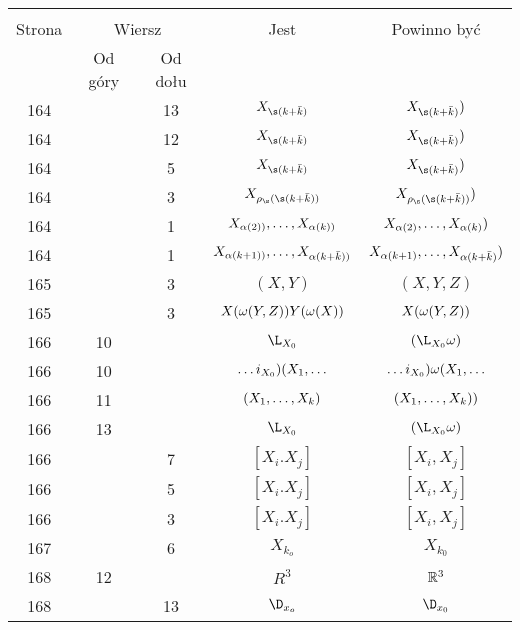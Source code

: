 \documentclass[a4paper,11pt]{article}
\begin{document}
\begin{center}
  \begin{tabular}{|c|c|c|c|c|}
    \hline
    & \multicolumn{2}{c|}{} & & \\
    Strona & \multicolumn{2}{c|}{Wiersz} & Jest
                              & Powinno być \\ \cline{2-3}
    & Od góry & Od dołu & & \\
    \hline
    164 & & 13 & $X_{ \s( k + \bar{ k } ) }$
           & $X_{ \s( k + \bar{ k } ) } )$ \\
    164 & & 12 & $X_{ \s( k + \bar{ k } ) }$
           & $X_{ \s( k + \bar{ k } ) } )$ \\
    164 & &  5 & $X_{ \s( k + \bar{ k } ) }$
           & $X_{ \s( k + \bar{ k } ) } )$ \\
    164 & &  3 & $X_{ \rho_{ \s }( \s( k + \bar{ k } ) ) }$
           & $X_{ \rho_{ \s }( \s( k + \bar{ k } ) ) } )$ \\
    164 & &  1 & $X_{ \alpha( 2 ) ) }, \ldots, X_{ \alpha( k ) ) }$
           & $X_{ \alpha( 2 ) }, \ldots, X_{ \alpha( k ) } )$ \\
    164 & &  1 & $X_{ \alpha( k + 1 ) ) }, \ldots, X_{ \alpha( k + \bar{ k } ) ) }$
           & $X_{ \alpha( k + 1 ) }, \ldots, X_{ \alpha( k + \bar{ k } ) } )$ \\
    165 & &  3 & $( X, Y )$ & $( X, Y, Z )$ \\
    165 & &  3 & $X( \omega( Y, Z ) ) Y( \omega( X ) )$
           & $X( \omega( Y, Z ) )$ \\
    166 & 10 & & $\L_{ { X_{ 0 } } }$ & $( \L_{ { X_{ 0 } } } \om )$ \\
    166 & 10 & & $\ldots i_{ { X_{ 0 } } } ) ( X_{ 1 }, \ldots$
           & $\ldots i_{ { X_{ 0 } } } ) \omega( X_{ 1 }, \ldots$ \\
    166 & 11 & & $( X_{ 1 }, \ldots, X_{ k } )$ & $( X_{ 1 }, \ldots,
                                               X_{ k } ))$ \\
    166 & 13 & & $\L_{ { X_{ 0 } } }$ & $( \L_{ { X_{ 0 } } } \om )$ \\
    166 & &  7 & $[ X_{ i }. X_{ j } ]$ & $[ X_{ i }, X_{ j } ]$ \\
    166 & &  5 & $[ X_{ i }. X_{ j } ]$ & $[ X_{ i }, X_{ j } ]$ \\
    166 & &  3 & $[ X_{ i }. X_{ j } ]$ & $[ X_{ i }, X_{ j } ]$ \\
    167 & &  6 & $X_{ k_{ o } }$ & $X_{ k_{ 0 } }$ \\
    168 & 12 & & $R^{ 3 }$ & $\mathbb{R}^{ 3 }$ \\
    168 & & 13 & $\D_{ x_{ o } }$ & $\D_{ x_{ 0 } }$ \\

\end{tabular}
\end{center}
\end{document}
